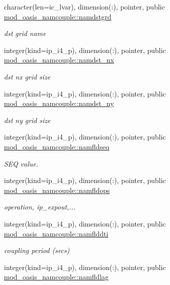 \begin{DoxyCompactItemize}
character(len=ic\+\_\+lvar), dimension(\+:), pointer, public \hyperlink{namespacemod__oasis__namcouple_a7a2ed64b0670db38d2287f5d452060e4}{mod\+\_\+oasis\+\_\+namcouple\+::namdstgrd}
\begin{DoxyCompactList}\small\item\em dst grid name \end{DoxyCompactList}\item 
integer(kind=ip\+\_\+i4\+\_\+p), dimension(\+:), pointer, public \hyperlink{namespacemod__oasis__namcouple_a6add94418eefdaefd78cd971888a5826}{mod\+\_\+oasis\+\_\+namcouple\+::namdst\+\_\+nx}
\begin{DoxyCompactList}\small\item\em dst nx grid size \end{DoxyCompactList}\item 
integer(kind=ip\+\_\+i4\+\_\+p), dimension(\+:), pointer, public \hyperlink{namespacemod__oasis__namcouple_a9035fc89396bad9574c88642d3aac5f0}{mod\+\_\+oasis\+\_\+namcouple\+::namdst\+\_\+ny}
\begin{DoxyCompactList}\small\item\em dst ny grid size \end{DoxyCompactList}\item 
integer(kind=ip\+\_\+i4\+\_\+p), dimension(\+:), pointer, public \hyperlink{namespacemod__oasis__namcouple_a54ccfe0380fc1c89d085f37a044a297e}{mod\+\_\+oasis\+\_\+namcouple\+::namfldseq}
\begin{DoxyCompactList}\small\item\em S\+EQ value. \end{DoxyCompactList}\item 
integer(kind=ip\+\_\+i4\+\_\+p), dimension(\+:), pointer, public \hyperlink{namespacemod__oasis__namcouple_a4841e350d91926f5f8403e73442c76ad}{mod\+\_\+oasis\+\_\+namcouple\+::namfldops}
\begin{DoxyCompactList}\small\item\em operation, ip\+\_\+expout,... \end{DoxyCompactList}\item 
integer(kind=ip\+\_\+i4\+\_\+p), dimension(\+:), pointer, public \hyperlink{namespacemod__oasis__namcouple_a9080617143dacb027f74c4c5158b5e58}{mod\+\_\+oasis\+\_\+namcouple\+::namflddti}
\begin{DoxyCompactList}\small\item\em coupling period (secs) \end{DoxyCompactList}\item 
integer(kind=ip\+\_\+i4\+\_\+p), dimension(\+:), pointer, public \hyperlink{namespacemod__oasis__namcouple_a6a4406ca14f91ef6514a18eb154e648f}{mod\+\_\+oasis\+\_\+namcouple\+::namfldlag}

\end{DoxyCompactItemize}
